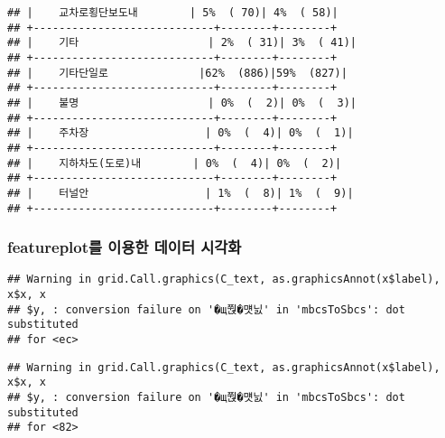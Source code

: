 \documentclass[]{article}
\newenvironment{Shaded}{\begin{snugshade}}{\end{snugshade}}
\newcommand{\KeywordTok}[1]{\textcolor[rgb]{0.13,0.29,0.53}{\textbf{#1}}}
\newcommand{\StringTok}[1]{\textcolor[rgb]{0.31,0.60,0.02}{#1}}
\newcommand{\ControlFlowTok}[1]{\textcolor[rgb]{0.13,0.29,0.53}{\textbf{#1}}}
\newcommand{\OperatorTok}[1]{\textcolor[rgb]{0.81,0.36,0.00}{\textbf{#1}}}
\newcommand{\NormalTok}[1]{#1}
\begin{document}
\begin{verbatim}
## |    교차로횡단보도내        | 5%  ( 70)| 4%  ( 58)|
## +----------------------------+--------+--------+
## |    기타                    | 2%  ( 31)| 3%  ( 41)|
## +----------------------------+--------+--------+
## |    기타단일로              |62%  (886)|59%  (827)|
## +----------------------------+--------+--------+
## |    불명                    | 0%  (  2)| 0%  (  3)|
## +----------------------------+--------+--------+
## |    주차장                  | 0%  (  4)| 0%  (  1)|
## +----------------------------+--------+--------+
## |    지하차도(도로)내        | 0%  (  4)| 0%  (  2)|
## +----------------------------+--------+--------+
## |    터널안                  | 1%  (  8)| 1%  (  9)|
## +----------------------------+--------+--------+
\end{verbatim}

\subsubsection{featureplot를 이용한 데이터 시각화}\label{featureplot---}

\begin{Shaded}
\end{Shaded}

\begin{verbatim}
## Warning in grid.Call.graphics(C_text, as.graphicsAnnot(x$label), x$x, x
## $y, : conversion failure on '�щ쭩�먯닔' in 'mbcsToSbcs': dot substituted
## for <ec>
\end{verbatim}

\begin{verbatim}
## Warning in grid.Call.graphics(C_text, as.graphicsAnnot(x$label), x$x, x
## $y, : conversion failure on '�щ쭩�먯닔' in 'mbcsToSbcs': dot substituted
## for <82>
\end{verbatim}
\end{document}
